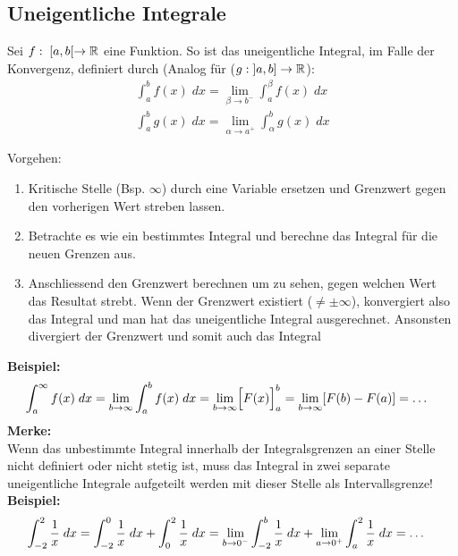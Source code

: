 
\subsection{Uneigentliche Integrale}
\begin{definition} Sei $f: \; [a, b[ \to \mathbb{R}$ eine Funktion. So ist das uneigentliche Integral, im Falle der Konvergenz, definiert durch (Analog für ($g: \; ]a, b] \to \mathbb{R}$):
\begin{align*}
	\int_a^b f(x) \; dx = \lim_{\beta \to b^-} \int_a^{\beta} f(x)\; dx\\
	\int_a^b g(x) \; dx = \lim_{\alpha \to a^+} \int_{\alpha}^{b} g(x)\; dx
\end{align*}
\end{definition}

Vorgehen:
\begin{enumerate}
	\item Kritische Stelle (Bsp. $\infty$) durch eine Variable ersetzen und Grenzwert gegen den vorherigen Wert streben lassen.

	\item Betrachte es wie ein bestimmtes Integral und berechne das Integral für die neuen Grenzen aus. 

	\item Anschliessend den Grenzwert berechnen um zu sehen, gegen welchen Wert das Resultat strebt. Wenn der Grenzwert existiert ($\neq \pm \infty$), konvergiert also das Integral und man hat das uneigentliche Integral ausgerechnet. Ansonsten divergiert der Grenzwert und somit auch das Integral
\end{enumerate}
{\small
\hspace{-0.35cm}
\textbf{Beispiel:}
\vspace{-0.2cm}
\begin{align*}
	\hspace{-0.35cm} \int_{a}^{\infty} f(x) \; dx = \lim_{b \to \infty} \int_a^b f(x) \; dx = \lim_{b \to \infty} \Bigl[ F(x) \Bigr]_a^b = \lim_{b \to \infty} [F(b) - F(a)] = \dots
\end{align*}}\textbf{Merke:} \\
Wenn das unbestimmte Integral innerhalb der Integralsgrenzen an einer Stelle nicht definiert oder nicht stetig ist, muss das Integral in zwei separate uneigentliche Integrale aufgeteilt werden mit dieser Stelle als Intervallsgrenze! \\

{\small
\hspace{-0.35cm}
\textbf{Beispiel:}
\vspace{-0.2cm}
\begin{align*}
	\hspace{-0.35cm} \int_{-2}^{2} \frac{1}{x} \; dx = \int_{-2}^{0} \frac{1}{x} \; dx + \int_{0}^{2} \frac{1}{x} \; dx = \lim_{b \to 0^-} \int_{-2}^{b} \frac{1}{x} \; dx + \lim_{a \to 0^+} \int_{a}^{2} \frac{1}{x} \; dx = \dots
\end{align*}}



